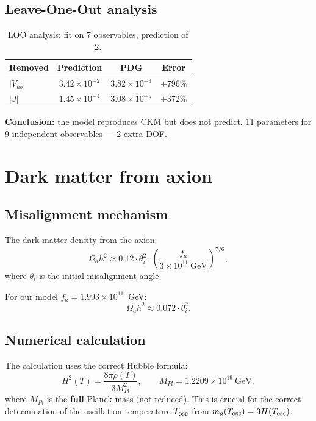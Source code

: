\documentclass[12pt,a4paper]{article}
\numberwithin{equation}{section}
\begin{document}
\subsection{Leave-One-Out analysis}

\begin{table}[H]
\centering
\caption{LOO analysis: fit on 7 observables, prediction of 2.}
\begin{tabular}{lccc}
\toprule
Removed & Prediction & PDG & Error \\
\midrule
$|V_{ub}|$ & $3.42 \times 10^{-2}$ & $3.82 \times 10^{-3}$ & $+796\%$ \\
$|J|$      & $1.45 \times 10^{-4}$ & $3.08 \times 10^{-5}$ & $+372\%$ \\
\bottomrule
\end{tabular}
\end{table}

\textbf{Conclusion:} the model reproduces CKM but does not predict.
11 parameters for 9 independent observables — 2 extra DOF.

\section{Dark matter from axion}
\label{sec:dm}

\subsection{Misalignment mechanism}

The dark matter density from the axion:
\begin{equation}
\Omega_a h^2 \approx 0.12 \cdot \theta_i^2 \cdot
\left(\frac{f_a}{3\times 10^{11}~\text{GeV}}\right)^{7/6},
\end{equation}
where $\theta_i$ is the initial misalignment angle.

For our model $f_a = 1.993\times 10^{11}$~GeV:
\begin{equation}
\Omega_a h^2 \approx 0.072 \cdot \theta_i^2.
\end{equation}

\subsection{Numerical calculation}

The calculation uses the correct Hubble formula:
\begin{equation}
H^2(T) = \frac{8\pi \rho(T)}{3 M_{Pl}^2}, \qquad
M_{Pl} = 1.2209\times 10^{19}~\text{GeV},
\end{equation}
where $M_{Pl}$ is the \textbf{full} Planck mass (not reduced).
This is crucial for the correct determination of the oscillation
temperature $T_{\rm osc}$ from $m_a(T_{\rm osc}) = 3 H(T_{\rm osc})$.
\end{document}
